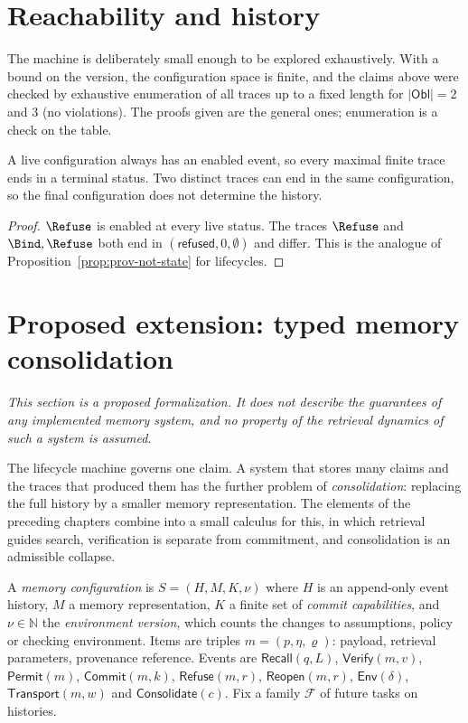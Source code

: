 \section{Reachability and history}

The machine is deliberately small enough to be explored exhaustively. With a bound on the version, the configuration space is finite, and the claims above were checked by exhaustive enumeration of all traces up to a fixed length for $|\mathsf{Obl}|=2$ and $3$ (no violations). The proofs given are the general ones; enumeration is a check on the table.

\begin{proposition}
\label{prop:terminal}
A live configuration always has an enabled event, so every maximal finite trace ends in a terminal status. Two distinct traces can end in the same configuration, so the final configuration does not determine the history.
\end{proposition}

\begin{proof}
$\Refuse$ is enabled at every live status. The traces $\Refuse$ and $\Bind,\Refuse$ both end in $(\textsf{refused},0,\emptyset)$ and differ. This is the analogue of Proposition~\ref{prop:prov-not-state} for lifecycles.
\end{proof}


\section{Proposed extension: typed memory consolidation}
\label{sec:memory}

\emph{This section is a proposed formalization. It does not describe the guarantees of any implemented memory system, and no property of the retrieval dynamics of such a system is assumed.}

The lifecycle machine governs one claim. A system that stores many claims and the traces that produced them has the further problem of \emph{consolidation}: replacing the full history by a smaller memory representation. The elements of the preceding chapters combine into a small calculus for this, in which retrieval guides search, verification is separate from commitment, and consolidation is an admissible collapse.

\begin{definition}
\label{def:memconfig}
A \emph{memory configuration} is $S=(H,M,K,\nu)$ where $H$ is an append-only event history, $M$ a memory representation, $K$ a finite set of \emph{commit capabilities}, and $\nu\in\mathbb N$ the \emph{environment version}, which counts the changes to assumptions, policy or checking environment. Items are triples $m=(p,\eta,\varrho)$: payload, retrieval parameters, provenance reference. Events are $\mathsf{Recall}(q,L)$, $\mathsf{Verify}(m,v)$, $\mathsf{Permit}(m)$, $\mathsf{Commit}(m,k)$, $\mathsf{Refuse}(m,r)$, $\mathsf{Reopen}(m,r)$, $\mathsf{Env}(\delta)$, $\mathsf{Transport}(m,w)$ and $\mathsf{Consolidate}(c)$. Fix a family $\mathcal F$ of future tasks on histories.
\end{definition}

